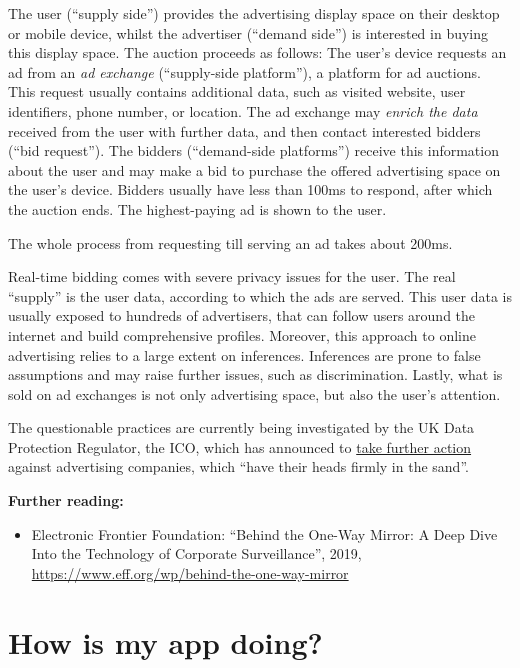 \documentclass[
]{book}
\providecommand{\tightlist}{%
  \setlength{\itemsep}{0pt}\setlength{\parskip}{0pt}}
\begin{document}
The user (``supply side'') provides the advertising display space on their desktop or mobile device, whilst the advertiser (``demand side'') is interested in buying this display space. The auction proceeds as follows: The user's device requests an ad from an \emph{ad exchange} (``supply-side platform''), a platform for ad auctions. This request usually contains additional data, such as visited website, user identifiers, phone number, or location. The ad exchange may \emph{enrich the data} received from the user with further data, and then contact interested bidders (``bid request''). The bidders (``demand-side platforms'') receive this information about the user and may make a bid to purchase the offered advertising space on the user's device. Bidders usually have less than 100ms to respond, after which the auction ends. The highest-paying ad is shown to the user.

The whole process from requesting till serving an ad takes about 200ms.

Real-time bidding comes with severe privacy issues for the user. The real ``supply'' is the user data, according to which the ads are served. This user data is usually exposed to hundreds of advertisers, that can follow users around the internet and build comprehensive profiles. Moreover, this approach to online advertising relies to a large extent on inferences. Inferences are prone to false assumptions and may raise further issues, such as discrimination. Lastly, what is sold on ad exchanges is not only advertising space, but also the user's attention.

The questionable practices are currently being investigated by the UK Data Protection Regulator, the ICO, which has announced to \href{https://ico.org.uk/about-the-ico/news-and-events/news-and-blogs/2020/01/blog-adtech-the-reform-of-real-time-bidding-has-started/}{take further action} against advertising companies, which ``have their heads firmly in the sand''.

\textbf{Further reading:}

\begin{itemize}
\tightlist
\item
  Electronic Frontier Foundation: ``Behind the One-Way Mirror: A Deep Dive Into the Technology of Corporate Surveillance'', 2019, \url{https://www.eff.org/wp/behind-the-one-way-mirror}
\end{itemize}

\hypertarget{how-is-my-app-doing}{%
\section{How is my app doing?}\label{how-is-my-app-doing}}
\end{document}
